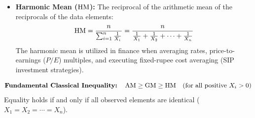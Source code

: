 \begin{formulabox}
\begin{itemize}[leftmargin=*, noitemsep]
    \item \textbf{Harmonic Mean ($\operatorname{HM}$):}
    The reciprocal of the arithmetic mean of the reciprocals of the data elements:
    \begin{equation}
        \operatorname{HM} = \frac{n}{\sum_{i=1}^{n} \frac{1}{X_i}} = \frac{n}{\frac{1}{X_1} + \frac{1}{X_2} + \cdots + \frac{1}{X_n}}
    \end{equation}
    The harmonic mean is utilized in finance when averaging rates, price-to-earnings ($P/E$) multiples, and executing fixed-rupee cost averaging (SIP investment strategies).
\end{itemize}
\begin{equation*}
    \textbf{Fundamental Classical Inequality:} \quad \operatorname{AM} \ge \operatorname{GM} \ge \operatorname{HM} \quad (\text{for all positive } X_i > 0)
\end{equation*}
Equality holds if and only if all observed elements are identical ($X_1 = X_2 = \cdots = X_n$).
\end{formulabox}

